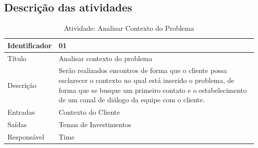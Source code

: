 \subsection{Descrição das atividades}


\begin{table}[]
\centering
\caption{Atividade: Analisar Contexto do Problema}
\label{atividade:1}
\begin{tabularx}{0.9\textwidth}{|>{}s |b|}
\hline
Identificador & 01                                                                                                                                                                                                                              \\ \hline
Título        & Analisar contexto do problema                                                                                                                                                                                                 \\ \hline
Descrição     & Serão realizados encontros de forma que o cliente possa esclarecer o contexto no qual está inserido o problema, de forma que se busque um primeiro contato e o estabelecimento de um canal de diálogo da equipe com o cliente. \\ \hline
Entradas       & Contexto do Cliente                                                                                                                                                                                                            \\ \hline
Saídas         & Temas de Investimentos                                                                                                                                                                                                         \\ \hline
Responsável   & Time                                                                                                                                                                                                                           \\ \hline
\end{tabularx}
\end{table}

